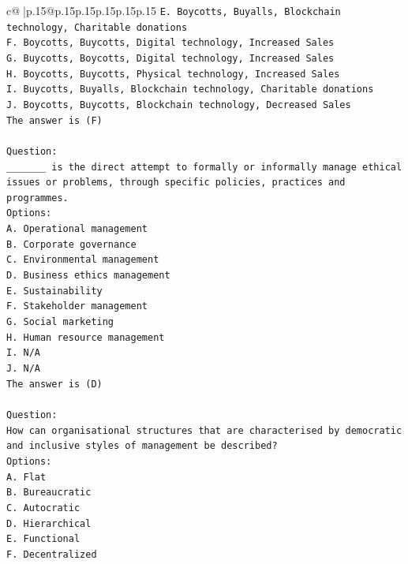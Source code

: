 \documentclass{article}
\begin{document}
{\begin{supertabular}{c@{$\;$}|p{.15\linewidth}@{}p{.15\linewidth}p{.15\linewidth}p{.15\linewidth}p{.15\linewidth}p{.15\linewidth}}
{{{\texttt{E. Boycotts, Buyalls, Blockchain technology, Charitable donations} \\
\texttt{F. Boycotts, Buycotts, Digital technology, Increased Sales} \\
\texttt{G. Buycotts, Boycotts, Digital technology, Increased Sales} \\
\texttt{H. Boycotts, Buycotts, Physical technology, Increased Sales} \\
\texttt{I. Buycotts, Buyalls, Blockchain technology, Charitable donations} \\
\texttt{J. Boycotts, Buycotts, Blockchain technology, Decreased Sales} \\
\texttt{The answer is (F)} \\
\\ 
\texttt{Question:} \\
\texttt{\_\_\_\_\_\_\_ is the direct attempt to formally or informally manage ethical issues or problems, through specific policies, practices and programmes.} \\
\texttt{Options:} \\
\texttt{A. Operational management} \\
\texttt{B. Corporate governance} \\
\texttt{C. Environmental management} \\
\texttt{D. Business ethics management} \\
\texttt{E. Sustainability} \\
\texttt{F. Stakeholder management} \\
\texttt{G. Social marketing} \\
\texttt{H. Human resource management} \\
\texttt{I. N/A} \\
\texttt{J. N/A} \\
\texttt{The answer is (D)} \\
\\ 
\texttt{Question:} \\
\texttt{How can organisational structures that are characterised by democratic and inclusive styles of management be described?} \\
\texttt{Options:} \\
\texttt{A. Flat} \\
\texttt{B. Bureaucratic} \\
\texttt{C. Autocratic} \\
\texttt{D. Hierarchical} \\
\texttt{E. Functional} \\
\texttt{F. Decentralized} \\
}}}
\end{supertabular}}
\end{document}
